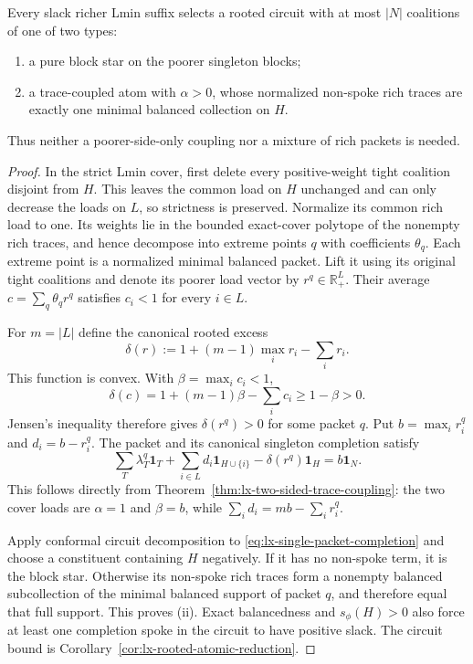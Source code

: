 \begin{corollary}
\label{cor:lx-star-or-trace-dichotomy}
Every slack richer Lmin suffix selects a rooted circuit with at most $|N|$
coalitions of one of two types:
\begin{enumerate}[label=(\roman*)]
\item a pure block star on the poorer singleton blocks;
\item a trace-coupled atom with $\alpha>0$, whose normalized non-spoke rich
traces are exactly one minimal balanced collection on $H$.
\end{enumerate}
Thus neither a poorer-side-only coupling nor a mixture of rich packets is
needed.
\end{corollary}

\begin{proof}
In the strict Lmin cover, first delete every positive-weight tight coalition
disjoint from $H$.  This leaves the common load on $H$ unchanged and can only
decrease the loads on $L$, so strictness is preserved.  Normalize its common
rich load to one.  Its weights lie in the bounded exact-cover polytope of the
nonempty rich traces, and hence decompose into extreme points $q$ with
coefficients $\theta_q$.  Each extreme point is a normalized minimal balanced
packet.  Lift it using its original tight coalitions and denote its poorer
load vector by $r^q\in\mathbb R_+^L$.  Their average $c=\sum_q\theta_qr^q$
satisfies $c_i<1$ for every $i\in L$.

For $m=|L|$ define the canonical rooted excess
\[
 \delta(r):=1+(m-1)\max_i r_i-\sum_i r_i.           \tag{CRE}
 \label{eq:lx-canonical-rooted-excess}
\]
This function is convex.  With $\beta=\max_i c_i<1$,
\[
 \delta(c)=1+(m-1)\beta-\sum_i c_i\geq1-\beta>0.
\]
Jensen's inequality therefore gives $\delta(r^q)>0$ for some packet $q$.
Put $b=\max_i r_i^q$ and $d_i=b-r_i^q$.  The packet and its canonical
singleton completion satisfy
\[
 \sum_T\lambda_T^q\mathbf1_T
 +\sum_{i\in L}d_i\mathbf1_{H\cup\{i\}}
 -\delta(r^q)\mathbf1_H=b\mathbf1_N.               \tag{CP}
 \label{eq:lx-single-packet-completion}
\]
This follows directly from Theorem~\ref{thm:lx-two-sided-trace-coupling}:
the two cover loads are $\alpha=1$ and $\beta=b$, while
$\sum_i d_i=mb-\sum_i r_i^q$.

Apply conformal circuit decomposition to
\eqref{eq:lx-single-packet-completion} and choose a constituent containing
$H$ negatively.  If it has no non-spoke term, it is the block star.  Otherwise
its non-spoke rich traces form a nonempty balanced subcollection of the
minimal balanced support of packet $q$, and therefore equal that full support.
This proves (ii).  Exact balancedness and $s_\phi(H)>0$ also force at least
one completion spoke in the circuit to have positive slack.  The circuit
bound is Corollary~\ref{cor:lx-rooted-atomic-reduction}.
\end{proof}

